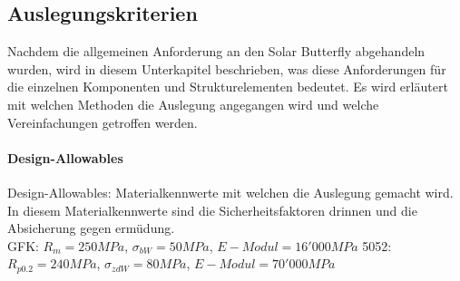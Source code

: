 \subsection{Auslegungskriterien}
Nachdem die allgemeinen Anforderung an den Solar Butterfly abgehandeln wurden, wird in diesem Unterkapitel beschrieben, was diese Anforderungen für die einzelnen Komponenten und Strukturelementen bedeutet. Es wird erläutert mit welchen Methoden die Auslegung angegangen wird und welche Vereinfachungen getroffen werden.\\

\paragraph{Design-Allowables}
Design-Allowables: Materialkennwerte mit welchen die Auslegung gemacht wird.\\
In diesem Materialkennwerte sind die Sicherheitsfaktoren drinnen und die Absicherung gegen ermüdung.\\

GFK: $R_m = 250 MPa$, $\sigma_{bW} = 50 MPa$, $E-Modul = 16'000 MPa$
5052: $R_{p0.2} = 240 MPa$, $\sigma_{zdW} = 80 MPa$, $E-Modul = 70'000 MPa$

